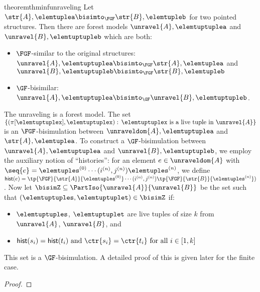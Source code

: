 \begin{restatable}{theorem}{thminfunraveling}\label{thm:inf-unraveling-upgrading}
  Let $\str{A}, \elemtuplea \bisimto_{\FGF} \str{B}, \elemtupleb$ for two pointed structures.
  Then there are forest models $\unravel{A}, \elemtuptuplea$ and $\unravel{B}, \elemtuptupleb$ which are both:
  \begin{itemize}
    \item $\FGF$-similar to the original structures: $\unravel{A}, \elemtuptuplea \bisimto_{\FGF} \str{A}, \elemtuplea$ and $\unravel{B}, \elemtuptupleb \bisimto_{\FGF} \str{B}, \elemtupleb$
    \item $\GF$-bisimilar: $\unravel{A}, \elemtuptuplea \bisimto_{\GF} \unravel{B}, \elemtuptupleb$.
  \end{itemize}
\end{restatable}
\begin{proofsketch}
  The unraveling is a forest model.
  The set $\{(\pi[\elemtuptuplex], \elemtuptuplex):\, \elemtuptuplex\ \text{is a live tuple in}\ \unravel{A} \}$ is an $\FGF$-bisimulation between $\unraveldom{A}, \elemtuptuplea$ and $\str{A}, \elemtuplea$.
  To construct a $\GF$-bisimulation between $\unravel{A}, \elemtuptuplea$ and $\unravel{B}, \elemtuptupleb$, we employ the auxiliary notion of ``histories'': for an element $e \in \unraveldom{A}$ with $\seq{e} = \elemtuples^{(0)}\cdots(i^{(n)}, j^{(n)})\elemtuples^{(n)}$, we define $\mathsf{hist}(e) = \tp{\FGF}{\str{A}}{\elemtuples^{(0)}} \cdots (i^{(n)}, j^{(n)}) \tp{\FGF}{\str{B}}{\elemtuples^{(n)}})$.
  Now let $\bisimZ \subseteq \PartIso{\unravel{A}}{\unravel{B}}$ be the set such that $(\elemtuptuples, \elemtuptuplet) \in \bisimZ$ if:
  \begin{itemize}
    \item $\elemtuptuples$, $\elemtuptuplet$ are live tuples of size $k$ from $\unravel{A}$, $\unravel{B}$, and
    \item $\mathsf{hist}(s_{i}) = \mathsf{hist}(t_{i})\text{ and }\ctr{s_{i}} = \ctr{t_{i}}\text{ for all }i \in [1, k]$
  \end{itemize}
  This set is a $\GF$-bisimulation.
  A detailed proof of this is given later for the finite case.
\end{proofsketch}
\begin{proof}
\end{proof}

